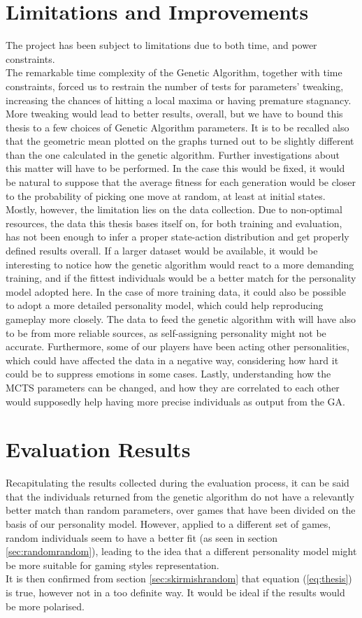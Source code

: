 \section{Limitations and Improvements}
The project has been subject to limitations due to both time, and power constraints.\\
The remarkable time complexity of the Genetic Algorithm, together with time constraints, forced us to restrain the number of tests for parameters' tweaking, increasing the chances of hitting a local maxima or having premature stagnancy. More tweaking would lead to better results, overall, but we have to bound this thesis to a few choices of Genetic Algorithm parameters. It is to be recalled also that the geometric mean plotted on the graphs turned out to be slightly different than the one calculated in the genetic algorithm. Further investigations about this matter will have to be performed. In the case this would be fixed, it would be natural to suppose that the average fitness for each generation would be closer to the probability of picking one move at random, at least at initial states.\\
Mostly, however, the limitation lies on the data collection. Due to non-optimal resources, the data this thesis bases itself on, for both training and evaluation, has not been enough to infer a proper state-action distribution and get properly defined results overall. If a larger dataset would be available, it would be interesting to notice how the genetic algorithm would react to a more demanding training, and if the fittest individuals would be a better match for the personality model adopted here. In the case of more training data, it could also be possible to adopt a more detailed personality model, which could help reproducing gameplay more closely. The data to feed the genetic algorithm with will have also to be from more reliable sources, as self-assigning personality might not be accurate. Furthermore, some of our players have been acting other personalities, which could have affected the data in a negative way, considering how hard it could be to suppress emotions in some cases.
Lastly, understanding how the MCTS parameters can be changed, and how they are correlated to each other would supposedly help having more precise individuals as output from the GA.
\section{Evaluation Results}
Recapitulating the results collected during the evaluation process, it can be said that the individuals returned from the genetic algorithm do not have a relevantly better match than random parameters, over games that have been divided on the basis of our personality model. However, applied to a different set of games, random individuals seem to have a better fit (as seen in section \ref{sec:randomrandom}), leading to the idea that a different personality model might be more suitable for gaming styles representation.\\
It is then confirmed from section \ref{sec:skirmishrandom} that equation (\ref{eq:thesis}) is true, however not in a too definite way. It would be ideal if the results would be more polarised.
